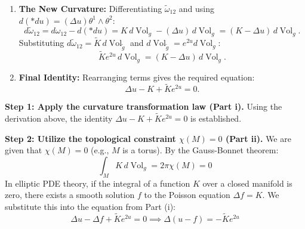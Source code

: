 \begin{solution}
\begin{enumerate}
    \item \textbf{The New Curvature:} Differentiating $\widetilde{\omega}_{12}$ and using $d(*du) = (\Delta u) \theta^1 \wedge \theta^2$:
    \[ d\widetilde{\omega}_{12} = d\omega_{12} - d(*du) = K \, d\operatorname{Vol}_g - (\Delta u) \, d\operatorname{Vol}_g = (K - \Delta u) \, d\operatorname{Vol}_g. \]
    Substituting $d\widetilde{\omega}_{12} = \widetilde{K} \, d\operatorname{Vol}_{\widetilde{g}}$ and $d\operatorname{Vol}_{\widetilde{g}} = e^{2u} d\operatorname{Vol}_g$:
    \[ \widetilde{K} e^{2u} \, d\operatorname{Vol}_g = (K - \Delta u) \, d\operatorname{Vol}_g. \]
    
    \item \textbf{Final Identity:} Rearranging terms gives the required equation:
    \[ \Delta u - K + \widetilde{K}e^{2u} = 0. \]
\end{enumerate}
\textbf{Step 1: Apply the curvature transformation law (Part i).}
Using the derivation above, the identity $\Delta u - K + \widetilde{K}e^{2u} = 0$ is established.

\textbf{Step 2: Utilize the topological constraint $\chi(M)=0$ (Part ii).}
We are given that $\chi(M) = 0$ (e.g., $M$ is a torus). By the Gauss-Bonnet theorem:
\begin{equation*}
    \int_M K \, d\operatorname{Vol}_g = 2\pi \chi(M) = 0
\end{equation*}
In elliptic PDE theory, if the integral of a function $K$ over a closed manifold is zero, there exists a smooth solution $f$ to the Poisson equation $\Delta f = K$. We substitute this into the equation from Part (i):
\begin{equation*}
    \Delta u - \Delta f + \widetilde{K}e^{2u} = 0 \implies \Delta(u - f) = -\widetilde{K}e^{2u}
\end{equation*}


\end{solution}

